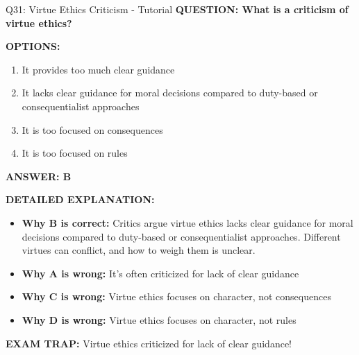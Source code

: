 \documentclass[8pt]{beamer}
\begin{document}
	\begin{frame}{Q31: Virtue Ethics Criticism - Tutorial}
		\fontsize{6.5}{7.5}\selectfont
		\textbf{QUESTION: What is a criticism of virtue ethics?}
		
		\vspace{0.1cm}
		\textbf{OPTIONS:}
		\begin{enumerate}
			\item It provides too much clear guidance
			\item It lacks clear guidance for moral decisions compared to duty-based or consequentialist approaches
			\item It is too focused on consequences
			\item It is too focused on rules
		\end{enumerate}
		
		\vspace{0.1cm}
		\textcolor{myblue}{\textbf{ANSWER: B}}
		
		\vspace{0.1cm}
		\textbf{DETAILED EXPLANATION:}
		\begin{itemize}
			\item \textbf{Why B is correct:} Critics argue virtue ethics lacks clear guidance for moral decisions compared to duty-based or consequentialist approaches. Different virtues can conflict, and how to weigh them is unclear.
			\item \textbf{Why A is wrong:} It's often criticized for lack of clear guidance
			\item \textbf{Why C is wrong:} Virtue ethics focuses on character, not consequences
			\item \textbf{Why D is wrong:} Virtue ethics focuses on character, not rules
		\end{itemize}
		
		\textcolor{myred}{\textbf{EXAM TRAP:}} Virtue ethics criticized for \textcolor{myblue}{lack of clear guidance}!
	\end{frame}
	
\end{document}
